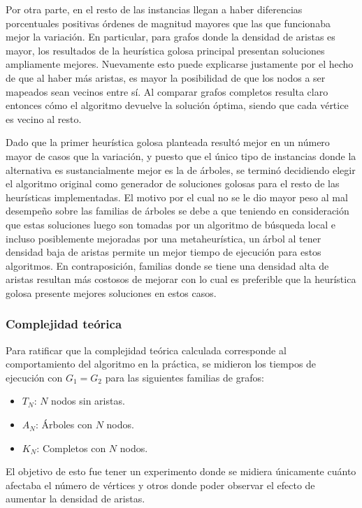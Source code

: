 Por otra parte, en el resto de las instancias llegan a haber diferencias
porcentuales positivas órdenes de magnitud mayores que las que funcionaba mejor
la variación. En particular, para grafos donde la densidad de aristas es mayor,
los resultados de la heurística golosa principal presentan soluciones
ampliamente mejores. Nuevamente esto puede explicarse justamente por el hecho de
que al haber más aristas, es mayor la posibilidad de que los nodos a ser
mapeados sean vecinos entre sí. Al comparar grafos completos resulta claro
entonces cómo el algoritmo devuelve la solución óptima, siendo que cada vértice
es vecino al resto.

Dado que la primer heurística golosa planteada resultó mejor en un número mayor
de casos que la variación, y puesto que el único tipo de instancias donde la
alternativa es sustancialmente mejor es la de árboles, se terminó decidiendo
elegir el algoritmo original como generador de soluciones golosas para el resto
de las heurísticas implementadas. El motivo por el cual no se le dio mayor peso
al mal desempeño  sobre las familias de árboles se debe a que teniendo en
consideración que estas soluciones luego son tomadas por un algoritmo de
búsqueda local e incluso posiblemente mejoradas por una metaheurística, un árbol
al tener densidad baja de aristas permite un mejor tiempo de ejecución para
estos algoritmos. En contraposición, familias donde se tiene una densidad alta
de aristas resultan más costosos de mejorar con lo cual es preferible que la
heurística golosa presente mejores soluciones en estos casos.

\subsubsection{Complejidad teórica}

Para ratificar que la complejidad teórica calculada corresponde al
comportamiento del algoritmo en la práctica, se midieron los tiempos de
ejecución con $G_1 = G_2$ para las siguientes familias de grafos:

\begin{itemize}
	\item $T_N$: $N$ nodos sin aristas.
	\item $A_N$: Árboles con $N$ nodos.
	\item $K_N$: Completos con $N$ nodos.
\end{itemize}

El objetivo de esto fue tener un experimento donde se midiera únicamente cuánto
afectaba el número de vértices y otros donde poder observar el efecto de
aumentar la densidad de aristas.

